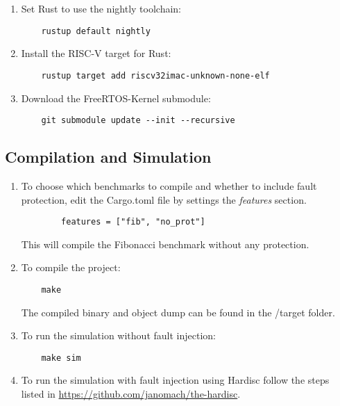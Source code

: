 \documentclass[12pt, letterpaper]{article}
\begin{document}
\begin{appendices}
\begin{enumerate}
    \item Set Rust to use the nightly toolchain:
    \begin{verbatim}
    rustup default nightly
    \end{verbatim}

    \item Install the RISC-V target for Rust:
    \begin{verbatim}
    rustup target add riscv32imac-unknown-none-elf
    \end{verbatim}

    \item Download the FreeRTOS-Kernel submodule:
    \begin{verbatim}
    git submodule update --init --recursive
    \end{verbatim}
\end{enumerate}

\subsection{Compilation and Simulation}

\begin{enumerate}
    \item To choose which benchmarks to compile and whether to include fault protection, edit the Cargo.toml file by settings the \textit{features} section.
    \begin{verbatim}
        features = ["fib", "no_prot"]
    \end{verbatim}
    This will compile the Fibonacci benchmark without any protection.
    \item To compile the project:
    \begin{verbatim}
    make
    \end{verbatim}
    The compiled binary and object dump can be found in the /target folder.

    \item To run the simulation without fault injection:
    \begin{verbatim}
    make sim
    \end{verbatim}

    \item To run the simulation with fault injection using Hardisc follow the steps listed in \url{https://github.com/janomach/the-hardisc}.
\end{enumerate}


\end{appendices}
\end{document}
